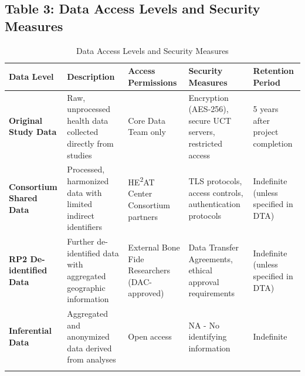 \graphicspath{{./}{./sections/images/}{./images/}}\documentclass[12pt,a4paper,landscape]{article}
\begin{document}
\subsection*{Table 3: Data Access Levels and Security Measures}
\begin{longtable}{L{3.5cm}L{5cm}L{4.5cm}L{4cm}L{3cm}}
\toprule
\textbf{Data Level} & \textbf{Description} & \textbf{Access Permissions} & \textbf{Security Measures} & \textbf{Retention Period} \\
\midrule
\endhead

\textbf{Original Study Data} 
& Raw, unprocessed health data collected directly from studies 
& Core Data Team only 
& Encryption (AES-256), secure UCT servers, restricted access 
& 5 years after project completion \\
\midrule

\textbf{Consortium Shared Data} 
& Processed, harmonized data with limited indirect identifiers 
& HE\textsuperscript{2}AT Center Consortium partners 
& TLS protocols, access controls, authentication protocols 
& Indefinite (unless specified in DTA) \\
\midrule

\textbf{RP2 De-identified Data} 
& Further de-identified data with aggregated geographic information 
& External Bone Fide Researchers (DAC-approved) 
& Data Transfer Agreements, ethical approval requirements 
& Indefinite (unless specified in DTA) \\
\midrule

\textbf{Inferential Data} 
& Aggregated and anonymized data derived from analyses 
& Open access 
& NA - No identifying information 
& Indefinite \\
\bottomrule
\caption{Data Access Levels and Security Measures}
\end{longtable}
\clearpage

\end{document}
